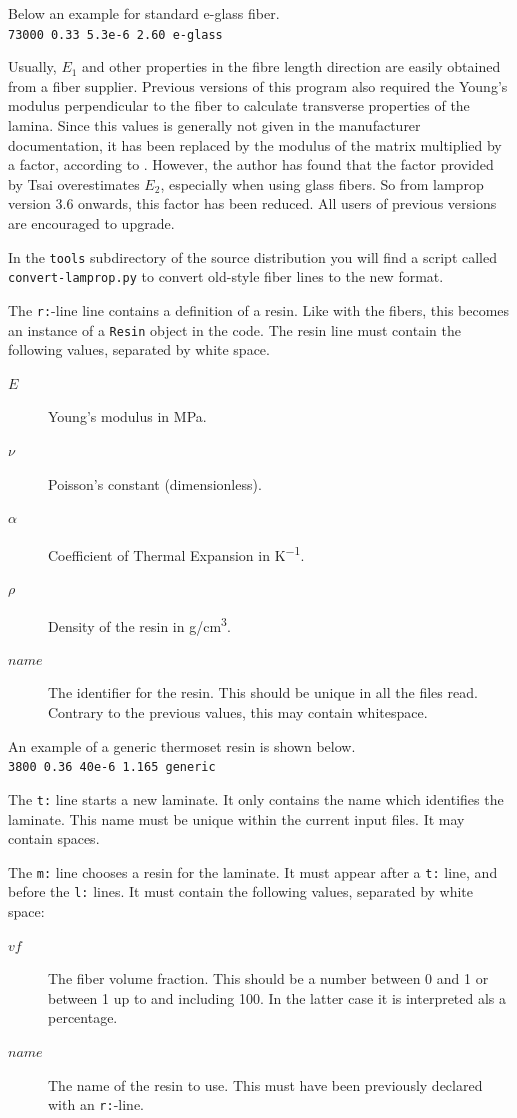 \documentclass[a4paper,landscape,oneside,11pt,twocolumn]{memoir}
\begin{document}
Below an example for standard e-glass fiber.\\
\texttt{73000 0.33 5.3e-6 2.60 e-glass}

Usually, $E_1$ and other properties in the fibre length direction are easily
obtained from a fiber supplier. Previous versions of this program also
required the Young's modulus perpendicular to the fiber to calculate
transverse properties of the lamina. Since this values is generally not given
in the manufacturer documentation, it has been replaced by the modulus of the
matrix multiplied by a factor, according to \citet{Tsai:1992}. However, the
author has found that the factor provided by Tsai overestimates $E_2$,
especially when using glass fibers. So from lamprop version 3.6 onwards, this
factor has been reduced. All users of previous versions are encouraged to
upgrade.

In the \texttt{tools} subdirectory of the source distribution you will find
a script called \texttt{convert-lamprop.py} to convert old-style fiber lines
to the new format.

The \texttt{r:}-line line contains a definition of a resin. Like with the
fibers, this becomes an instance of a \texttt{Resin} object in the code. The
resin line must contain the following values, separated by white space.
\begin{description}
    \item[$E$] Young's modulus in \si{MPa}.
    \item[$\nu$] Poisson's constant (dimensionless).
    \item[$\alpha$] Coefficient of Thermal Expansion in \si{K^{-1}}.
    \item[$\rho$] Density of the resin in \si{g/cm^3}.
    \item[$name$] The identifier for the resin. This should be unique in all
        the files read. Contrary to the previous values, this may contain
        whitespace.
\end{description}

An example of a generic thermoset resin is shown below.\\
\texttt{3800 0.36 40e-6 1.165 generic}

The \texttt{t:} line starts a new laminate. It only contains the name which
identifies the laminate. This name must be unique within the current input
files. It may contain spaces.

The \texttt{m:} line chooses a resin for the laminate. It must appear after
a \texttt{t:} line, and before the \texttt{l:} lines. It must contain the
following values, separated by white space:
\begin{description}
    \item[$vf$] The fiber volume fraction. This should be a number between
        0 and 1 or between 1 up to and including 100. In the latter case it
        is interpreted als a percentage.
    \item[$name$] The name of the resin to use. This must have been previously
        declared with an \texttt{r:}-line.
\end{description}
\end{document}
